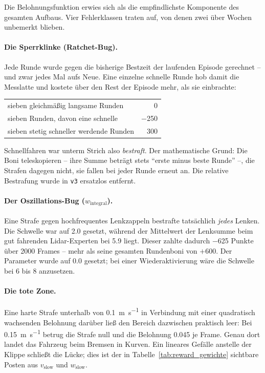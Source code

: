 Die Belohnungsfunktion erwies sich als die empfindlichste Komponente des gesamten Aufbaus. Vier Fehlerklassen traten auf, von denen zwei über Wochen unbemerkt blieben.

\paragraph{Die Sperrklinke (Ratchet-Bug).}
Jede Runde wurde gegen die bisherige Bestzeit der laufenden Episode gerechnet -- und zwar jedes Mal aufs Neue. Eine einzelne schnelle Runde hob damit die Messlatte und kostete über den Rest der Episode mehr, als sie einbrachte:
\begin{center}
\begin{tabular}{@{}l r@{}}
  sieben gleichmäßig langsame Runden        & \num{0} \\
  sieben Runden, davon eine schnelle        & \num{-250} \\
  sieben stetig schneller werdende Runden   & \num{+300} \\
\end{tabular}
\end{center}
Schnellfahren war unterm Strich also \emph{bestraft}. Der mathematische Grund: Die Boni teleskopieren -- ihre Summe beträgt stets \enquote{erste minus beste Runde} --, die Strafen dagegen nicht, sie fallen bei jeder Runde erneut an. Die relative Bestrafung wurde in \texttt{v3} ersatzlos entfernt.

\paragraph{Der Oszillations-Bug ($w_{\text{integral}}$).}
Eine Strafe gegen hochfrequentes Lenkzappeln bestrafte tatsächlich \emph{jedes} Lenken. Die Schwelle war auf \num{2.0} gesetzt, während der Mittelwert der Lenksumme beim gut fahrenden Lidar-Experten bei \num{5.9} liegt. Dieser zahlte dadurch \num{-625} Punkte über \num{2000} Frames -- mehr als seine gesamten Rundenboni von $+600$. Der Parameter wurde auf \num{0.0} gesetzt; bei einer Wiederaktivierung wäre die Schwelle bei 6 bis 8 anzusetzen.

\paragraph{Die tote Zone.}
Eine harte Strafe unterhalb von \SI{0.1}{\meter\per\second} in Verbindung mit einer quadratisch wachsenden Belohnung darüber ließ den Bereich dazwischen praktisch leer: Bei \SI{0.15}{\meter\per\second} betrug die Strafe null und die Belohnung \num{0.045} je Frame. Genau dort landet das Fahrzeug beim Bremsen in Kurven. Ein lineares Gefälle anstelle der Klippe schließt die Lücke; dies ist der in Tabelle~\ref{tab:reward_gewichte} sichtbare Posten aus $v_{\text{slow}}$ und $w_{\text{slow}}$.

